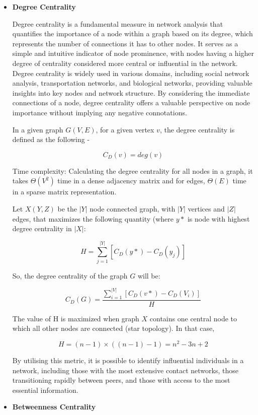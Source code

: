 \documentclass{article}
\begin{document}
\begin{itemize}

\item \textbf{Degree Centrality}

Degree centrality is a fundamental measure in network analysis that quantifies the importance of a node within a graph based on its degree, which represents the number of connections it has to other nodes. It serves as a simple and intuitive indicator of node prominence, with nodes having a higher degree of centrality considered more central or influential in the network. Degree centrality is widely used in various domains, including social network analysis, transportation networks, and biological networks, providing valuable insights into key nodes and network structure. By considering the immediate connections of a node, degree centrality offers a valuable perspective on node importance without implying any negative connotations.

In a given graph $G(V, E)$, for a given vertex $v$, the degree centrality is defined as the following -

$$ C_{D}(v) = deg(v) $$

Time complexity: Calculating the degree centrality for all nodes in a graph, it takes $\Theta(V^{2})$ time in a dense adjacency matrix and for edges, $\Theta(E)$ time in a sparse matrix representation.

Let $X(Y,Z)$ be the $|Y|$ node connected graph, with $|Y|$ vertices and $|Z|$ edges, that maximizes the following quantity (where $y*$ is node with highest degree centrality in $|X|$:

$$ H = \sum_{j = 1}^{|Y|} [C_{D}(y*) - C_{D}(y_{j})]$$

So, the degree centrality of the graph $G$ will be:

$$ C_{D}(G) = \frac{\sum_{i=1}^{|V|}[C_{D}(v*) - C_{D}(V_i)]}{H} $$

The value of H is maximized when graph $X$ contains one central node to which all other nodes are connected (star topology). In that case, 

$$H = (n-1) \times ((n-1)-1) = n^{2}-3n+2 $$

By utilising this metric, it is possible to identify influential individuals in a network, including those with the most extensive contact networks, those transitioning rapidly between peers, and those with access to the most essential information.

\item \textbf{Betweenness Centrality}


\end{itemize}
\end{document}
